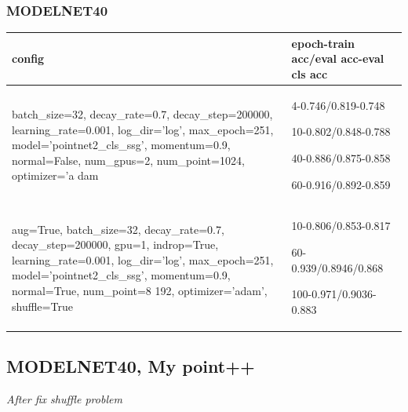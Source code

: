\documentclass[,table,dvipsnames]{article}
\begin{document}
\subsubsection{MODELNET40}
\begin{tabular}{ |p{8cm}|p{5cm}| }
	\hline
	config & epoch-train acc/eval acc-eval cls acc \\ 
	\hline
	batch\_size=32, decay\_rate=0.7, decay\_step=200000, learning\_rate=0.001, log\_dir='log', max\_epoch=251, model='pointnet2\_cls\_ssg', momentum=0.9, normal=False, num\_gpus=2, num\_point=1024, optimizer='a     dam &4-0.746/0.819-0.748\par 10-0.802/0.848-0.788\par 40-0.886/0.875-0.858\par 60-0.916/0.892-0.859 \\
	\hline
	aug=True, batch\_size=32, decay\_rate=0.7, decay\_step=200000, gpu=1, indrop=True, learning\_rate=0.001, log\_dir='log', max\_epoch=251, model='pointnet2\_cls\_ssg', momentum=0.9, normal=True, num\_point=8     192, optimizer='adam', shuffle=True & 10-0.806/0.853-0.817 \par  60-0.939/0.8946/0.868 \par 100-0.971/0.9036-0.883\\
	\hline

\end{tabular}
\noindent
\subsection{MODELNET40, My point++}	
\emph{After fix shuffle problem}
\end{document}
